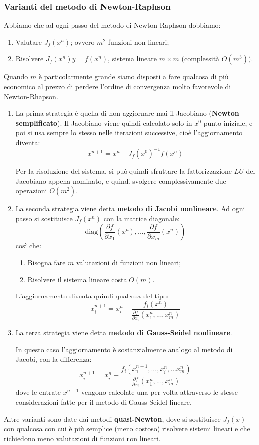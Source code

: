 \documentclass[a4paper,11pt]{article}
\begin{document}
\subsubsection{Varianti del metodo di Newton-Raphson}
Abbiamo che ad ogni passo del metodo di Newton-Raphson dobbiamo:
\begin{enumerate}
	\item Valutare $J_f(x^n)$; ovvero $m^2$ funzioni non lineari;
	\item Risolvere $J_f(x^n) y = f(x^n)$, sistema lineare $m \times m$ (complessità $O(m^3))$.
\end{enumerate}

Quando $m$ è particolarmente grande siamo disposti a fare qualcosa di più economico al prezzo di perdere l'ordine di convergenza molto favorevole di Newton-Rhapson.

\begin{enumerate}
	\item La prima strategia è quella di non aggiornare mai il Jacobiano (\textbf{Newton semplificato}).
		Il Jacobiano viene quindi calcolato solo in $x^0$ punto iniziale, e poi si usa sempre lo stesso nelle iterazioni successive, cioè l'aggiornamento diventa:
		$$
			x^{n + 1} = x^n - J_f(x^0)^{-1} f(x^n)
		$$
		
		Per la risoluzione del sistema, si può quindi sfruttare la fattorizzazione $LU$ del Jacobiano appena nominato, e quindi svolgere complessivamente due operazioni $O(m^2)$.

	\item La seconda strategia viene detta \textbf{metodo di Jacobi nonlineare}.
		Ad ogni passo si sostituisce $J_f(x^n)$ con la matrice diagonale:
		$$
		\mathrm{diag} \left( \frac{\partial f}{\partial x_1} (x^n), ..., \frac{\partial f}{\partial x_m} (x^n) \right)
		$$
		così che:
		\begin{enumerate}
			\item Bisogna fare $m$ valutazioni di funzioni non lineari;
			\item Risolvere il sistema lineare costa $O(m)$.
		\end{enumerate}

		L'aggiornamento diventa quindi qualcosa del tipo:
		$$
		x_i^{n + 1} = x_i^n - \frac{f_i(x^n)}{\frac{\partial f}{\partial x_i} (x_1^n, ..., x_m^n)}
		$$

	\item La terza strategia viene detta \textbf{metodo di Gauss-Seidel nonlineare}.

		In questo caso l'aggiornamento è sostanzialmente analogo al metodo di Jacobi, con la differenza:
		$$
		x_i^{n + 1} = x_i^n - \frac{f_i(x_1^{n + 1}, ..., x_i^{n}, ... x_m^n)}{\frac{\partial f}{\partial x_i} (x_1^n, ..., x_m^n)}
		$$
		dove le entrate $x^{n + 1}$ vengono calcolate una per volta attraverso le stesse considerazioni fatte per il metodo di Gauss-Seidel lineare.
\end{enumerate}

Altre varianti sono date dai metodi \textbf{quasi-Newton}, dove si sostituisce $J_f(x)$ con qualcosa con cui è più semplice (meno costoso) risolvere sistemi lineari e che richiedono meno valutazioni di funzioni non lineari.
\end{document}
